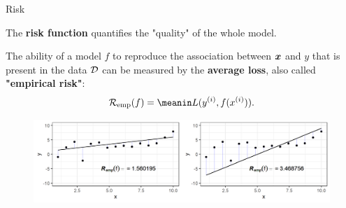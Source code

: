 \documentclass[11pt,compress,t,notes=noshow, xcolor=table]{beamer}
\begin{document}
\begin{vbframe}{Risk}

The \textbf{risk function} quantifies the "quality" of the whole model. 

\lz

The ability of a model $f$ to reproduce the association between $\bm{x}$ and $y$ that is present in the data $\mathcal{D}$ can be measured by the \textbf{average loss}, also called \textbf{"empirical risk"}: \\

  $$
  \riskef = \meanin \Lxyi.
  $$  
        

\vfill

\begin{center}
\begin{figure}[!b]
\includegraphics[width=1\textwidth]{figure_man/ml-basic_riskmin-2-risk.png}
\end{figure}
\end{center}
   
\vspace*{0.1cm}   
   
\end{vbframe}
\end{document}
